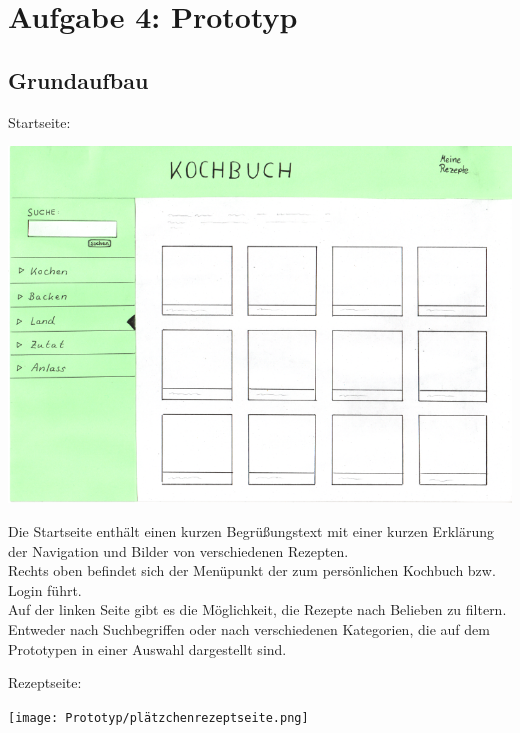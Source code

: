 \documentclass[parskip,10pt,abstracton]{scrartcl}
\begin{document}
\pagebreak
\section*{Aufgabe 4: Prototyp}


\subsection*{Grundaufbau}

Startseite:
\begin{center}
\includegraphics[scale=0.4]{Prototyp/home.png}
\end{center}

Die Startseite enthält einen kurzen Begrüßungstext mit einer kurzen Erklärung der Navigation und Bilder von verschiedenen Rezepten.\\
Rechts oben befindet sich der Menüpunkt der zum persönlichen Kochbuch bzw. Login führt.\\
Auf der linken Seite gibt es die Möglichkeit, die Rezepte nach Belieben zu filtern. Entweder nach Suchbegriffen oder nach verschiedenen Kategorien, die auf dem Prototypen in einer Auswahl dargestellt sind.

\pagebreak
Rezeptseite:
\begin{center}
\texttt{[image: Prototyp/plätzchenrezeptseite.png]}
\end{center}
\end{document}
